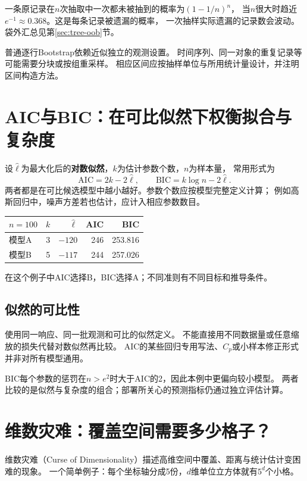 一条原记录在$n$次抽取中一次都未被抽到的概率为$(1-1/n)^n$，
当$n$很大时趋近$e^{-1}\approx0.368$。这是每条记录被遗漏的概率，
一次抽样实际遗漏的记录数会波动。袋外汇总见第\ref{sec:tree-oob}节。

\begin{pitfall}[重采样必须尊重数据结构]
普通逐行Bootstrap依赖近似独立的观测设置。
时间序列、同一对象的重复记录等可能需要分块或按组重采样。
相应区间应按抽样单位与所用统计量设计，并注明区间构造方法。
\end{pitfall}

\section{AIC与BIC：在可比似然下权衡拟合与复杂度}
\label{sec:tools-aic}
设$\hat\ell$为最大化后的\textbf{对数似然}，$k$为估计参数个数，$n$为样本量，
常用形式为
\[
 \mathrm{AIC}=2k-2\hat\ell,\qquad
 \mathrm{BIC}=k\log n-2\hat\ell.
\]
两者都是在可比候选模型中越小越好。参数个数应按模型完整定义计算；
例如高斯回归中，噪声方差若也估计，应计入相应参数数目。

\begin{center}
\begin{tabular}{lrrrr}
\toprule
$n=100$ & $k$ & $\hat\ell$ & AIC & BIC\\
\midrule
模型A & 3 & $-120$ & 246 & 253.816\\
模型B & 5 & $-117$ & 244 & 257.026\\
\bottomrule
\end{tabular}
\end{center}
在这个例子中AIC选择B，BIC选择A；不同准则有不同目标和推导条件。

\subsection{似然的可比性}
使用同一响应、同一批观测和可比的似然定义。
不能直接用不同数据量或任意缩放的损失代替对数似然再比较。
AIC的某些回归专用写法、$C_p$或小样本修正形式并非对所有模型通用。

BIC每个参数的惩罚在$n>e^2$时大于AIC的2，因此本例中更偏向较小模型。
两者比较的是似然与复杂度的组合；部署所关心的预测指标仍通过独立评估计算。

\section{维数灾难：覆盖空间需要多少格子？}
\label{sec:tools-dimension}
维数灾难（Curse of Dimensionality）描述高维空间中覆盖、距离与统计估计变困难的现象。
一个简单例子：每个坐标轴分成5份，$d$维单位立方体就有$5^d$个小格。

